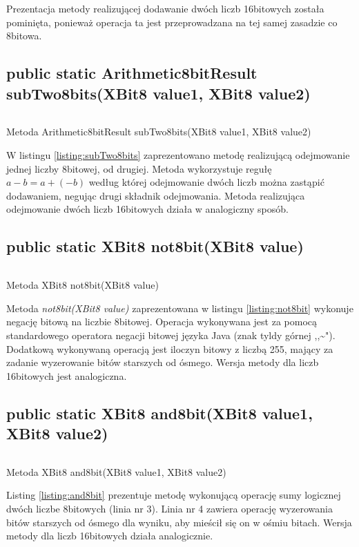 Prezentacja metody realizującej dodawanie dwóch liczb 16{\dywiz}bitowych została pominięta, ponieważ operacja ta jest przeprowadzana na tej samej zasadzie co 8{\dywiz}bitowa.

\subsection{public static Arithmetic8bitResult subTwo8bits(XBit8 value1, XBit8 value2)}
\begin{listing}[h]
	\inputminted{java}{listings/xbit/subTwo8bits.java}
	\caption{Metoda Arithmetic8bitResult subTwo8bits(XBit8 value1, XBit8 value2)}
	\label{listing:subTwo8bits}
\end{listing}
W listingu \ref{listing:subTwo8bits} zaprezentowano metodę realizującą odejmowanie jednej liczby 8{\dywiz}bitowej, od drugiej. Metoda wykorzystuje regułę 
$ a - b = a+(-b) $ według której odejmowanie dwóch liczb można zastąpić dodawaniem, negując drugi składnik odejmowania. 
Metoda realizująca odejmowanie dwóch liczb 16{\dywiz}bitowych działa w analogiczny sposób.

\subsection{public static XBit8 not8bit(XBit8 value)}
\begin{listing}[h]
	\inputminted{java}{listings/xbit/not8bit.java}
	\caption{Metoda XBit8 not8bit(XBit8 value)}
	\label{listing:not8bit}
\end{listing}
Metoda \emph{not8bit(XBit8 value)} zaprezentowana w listingu \ref{listing:not8bit} wykonuje negację bitową na liczbie 8{\dywiz}bitowej. Operacja wykonywana jest za pomocą standardowego operatora negacji bitowej języka Java (znak tyldy górnej ,,\~{}"). Dodatkową wykonywaną operacją jest iloczyn bitowy z liczbą 255, mający za zadanie wyzerowanie bitów starszych od ósmego. Wersja metody dla liczb 16{\dywiz}bitowych jest analogiczna.

\subsection{public static XBit8 and8bit(XBit8 value1, XBit8 value2)}
\begin{listing}[h]
	\inputminted{java}{listings/xbit/and8bit.java}
	\caption{Metoda XBit8 and8bit(XBit8 value1, XBit8 value2)}
	\label{listing:and8bit}
\end{listing}
Listing \ref{listing:and8bit} prezentuje metodę wykonującą operację sumy logicznej dwóch liczbe \mbox{8{\dywiz}bitowych} (linia nr 3). Linia nr 4 zawiera operację wyzerowania bitów starszych od ósmego dla wyniku, aby mieścił się on w ośmiu bitach. Wersja metody dla liczb \mbox{16{\dywiz}bitowych} działa analogicznie.

